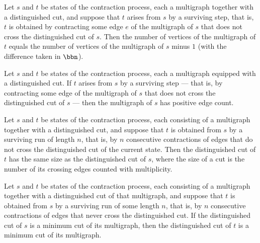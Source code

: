 \begin{lemma}
\label{KargerTrace.survivingStep_vertexCount_eq}
\leanok
{}
Let $s$ and $t$ be states of the contraction process, each a multigraph together with a
distinguished cut, and suppose that $t$ arises from $s$ by a surviving step, that is,
$t$ is obtained by contracting some edge $e$ of the multigraph of $s$ that does not
cross the distinguished cut of $s$. Then the number of vertices of the multigraph of $t$
equals the number of vertices of the multigraph of $s$ minus $1$ (with the difference
taken in $\bbn$).
\end{lemma}

\begin{lemma}
\label{KargerTrace.survivingStep_edgeCount_pos}
\leanok
{}
Let $s$ and $t$ be states of the contraction process, each a multigraph equipped with a
distinguished cut. If $t$ arises from $s$ by a surviving step — that is, by contracting
some edge of the multigraph of $s$ that does not cross the distinguished cut of $s$ —
then the multigraph of $s$ has positive edge count.
\end{lemma}

\begin{lemma}
\label{KargerTrace.survivingRun_cut_size_eq}
\leanok
{}
Let $s$ and $t$ be states of the contraction process, each consisting of a multigraph
together with a distinguished cut, and suppose that $t$ is obtained from $s$ by a
surviving run of length $n$, that is, by $n$ consecutive contractions of edges that do
not cross the distinguished cut of the current state. Then the distinguished cut of $t$
has the same size as the distinguished cut of $s$, where the size of a cut is the number
of its crossing edges counted with multiplicity.
\end{lemma}

\begin{lemma}
\label{KargerTrace.survivingRun_mincut}
\leanok
{}
Let $s$ and $t$ be states of the contraction process, each consisting of a multigraph
together with a distinguished cut of that multigraph, and suppose that $t$ is obtained
from $s$ by a surviving run of some length $n$, that is, by $n$ consecutive contractions
of edges that never cross the distinguished cut. If the distinguished cut of $s$ is a
minimum cut of its multigraph, then the distinguished cut of $t$ is a minimum cut of its
multigraph.
\end{lemma}

